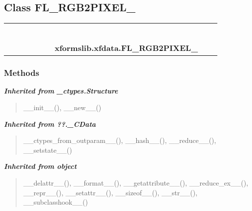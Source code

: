 \subsection{Class FL\_RGB2PIXEL\_}

    \label{xformslib:xfdata:FL_RGB2PIXEL_}
\begin{tabular}{cccccccccc}
\multicolumn{2}{r}{\settowidth{\BCL}{object}\multirow{2}{\BCL}{object}}
&&
&&
&&
  \\\cline{3-3}
  &&\multicolumn{1}{c|}{}
&&
&&
&&
  \\
\multicolumn{4}{r}{\settowidth{\BCL}{??.\_CData}\multirow{2}{\BCL}{??.\_CData}}
&&
&&
  \\\cline{5-5}
  &&&&\multicolumn{1}{c|}{}
&&
&&
  \\
\multicolumn{6}{r}{\settowidth{\BCL}{\_ctypes.Structure}\multirow{2}{\BCL}{\_ctypes.Structure}}
&&
  \\\cline{7-7}
  &&&&&&\multicolumn{1}{c|}{}
&&
  \\
&&&&&&\multicolumn{2}{l}{\textbf{xformslib.xfdata.FL\_RGB2PIXEL\_}}
\end{tabular}



  \subsubsection{Methods}


\large{\textbf{\textit{Inherited from \_ctypes.Structure}}}

\begin{quote}
\_\_init\_\_(), \_\_new\_\_()
\end{quote}

\large{\textbf{\textit{Inherited from ??.\_CData}}}

\begin{quote}
\_\_ctypes\_from\_outparam\_\_(), \_\_hash\_\_(), \_\_reduce\_\_(), \_\_setstate\_\_()
\end{quote}

\large{\textbf{\textit{Inherited from object}}}

\begin{quote}
\_\_delattr\_\_(), \_\_format\_\_(), \_\_getattribute\_\_(), \_\_reduce\_ex\_\_(), \_\_repr\_\_(), \_\_setattr\_\_(), \_\_sizeof\_\_(), \_\_str\_\_(), \_\_subclasshook\_\_()
\end{quote}

